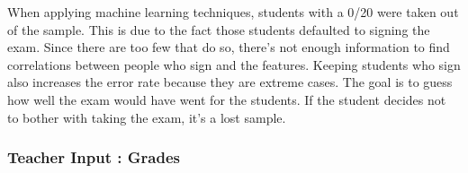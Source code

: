 \documentclass[a4paper,11pt]{report}
\numberwithin{figure}{section} %
\begin{document}
    When applying machine learning techniques, students with a 0/20 were taken out of the sample.
    This is due to the fact those students defaulted to signing the exam.
    Since there are too few that do so, there's not enough information to find correlations between people who sign and the features.
    Keeping students who sign also increases the error rate because they are extreme cases.
    The goal is to guess how well the exam would have went for the students.
    If the student decides not to bother with taking the exam, it's a lost sample.\newline
    
    	\subsubsection{Teacher Input : Grades}
    
    
\end{document}
